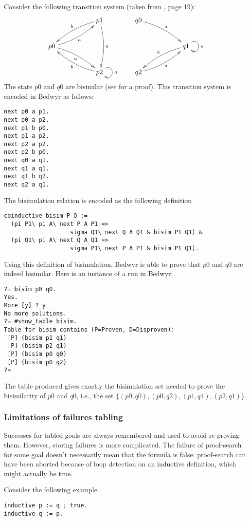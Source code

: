 \documentclass{article}
\begin{document}
Consider the following transition system (taken from \cite{milner99book}, 
page 19):
$$
\xymatrix{
   &  & p1 \ar@/_/[lld]_b \ar@/^/[dd]^a \\
p0 \ar@/_/[rru]_a \ar@/^/[rrd]_a \\
 & & p2 \ar@(ur,dr)^a \ar@/^/[llu]^b
}
\qquad
\xymatrix{
q0 \ar@/^/[rrd]^a \\
 & & q1 \ar@(ur,dr)^a \ar@/_/[dll]_b \\
q2 \ar@/_/[rru]_a
}
$$
The state $p0$ and $q0$ are bisimilar (see \cite{milner99book} for a proof).
This transition system is encoded in Bedwyr as follows:
\begin{verbatim}
next p0 a p1.
next p0 a p2.
next p1 b p0.
next p1 a p2.
next p2 a p2.
next p2 b p0.
next q0 a q1.
next q1 a q1.
next q1 b q2.
next q2 a q1.
\end{verbatim}
The bisimulation relation is encoded as the following definition
\begin{verbatim}
coinductive bisim P Q := 
  (pi P1\ pi A\ next P A P1 => 
                   sigma Q1\ next Q A Q1 & bisim P1 Q1) &
  (pi Q1\ pi A\ next Q A Q1 => 
                   sigma P1\ next P A P1 & bisim P1 Q1).
\end{verbatim}
Using this definition of bisimulation, Bedwyr is able to prove that
$p0$ and $q0$ are indeed bisimilar. Here is an instance of a run in Bedwyr:
\begin{verbatim}
?= bisim p0 q0.
Yes.
More [y] ? y
No more solutions.
?= #show_table bisim.
Table for bisim contains (P=Proven, D=Disproven):
 [P] (bisim p1 q1)
 [P] (bisim p2 q1)
 [P] (bisim p0 q0)
 [P] (bisim p0 q2)
?=
\end{verbatim}
The table produced gives exactly the bisimulation set
needed to prove the bisimilarity of $p0$ and $q0$, i.e.,
the set $\{(p0,q0), (p0, q2), (p1,q1), (p2,q1) \}.$

\subsubsection{Limitations of failures tabling}
\label{restrict-failures-tabling}

Successes for tabled goals are always remembered and used to avoid
re-proving them. However, storing failures is more complicated.
The failure of proof-search for some goal doesn't necessarily mean
that the formula is false: proof-search can have been aborted because
of loop detection on an inductive definition, which might actually be true.

Consider the following example.
\begin{verbatim}
inductive p := q ; true.
inductive q := p.
\end{verbatim}
\end{document}
